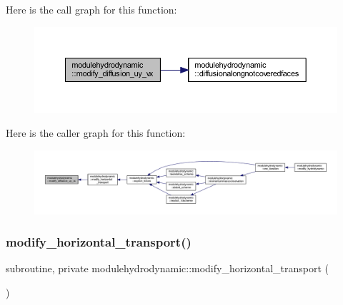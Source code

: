 Here is the call graph for this function\+:\nopagebreak
\begin{figure}[H]
\begin{center}
\leavevmode
\includegraphics[width=350pt]{namespacemodulehydrodynamic_a8bf6e87d87f18ed2725786160a05e8d4_cgraph}
\end{center}
\end{figure}
Here is the caller graph for this function\+:\nopagebreak
\begin{figure}[H]
\begin{center}
\leavevmode
\includegraphics[width=350pt]{namespacemodulehydrodynamic_a8bf6e87d87f18ed2725786160a05e8d4_icgraph}
\end{center}
\end{figure}
\mbox{\label{namespacemodulehydrodynamic_a4bfe52cf1e114fade20b4037cfdf542a}} 
\subsubsection{\texorpdfstring{modify\+\_\+horizontal\+\_\+transport()}{modify\_horizontal\_transport()}}
{\footnotesize\ttfamily subroutine, private modulehydrodynamic\+::modify\+\_\+horizontal\+\_\+transport (\begin{DoxyParamCaption}{ }\end{DoxyParamCaption})\hspace{0.3cm}{\ttfamily [private]}}

